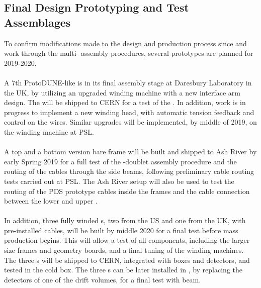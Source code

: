 


\subsection{Final Design Prototyping and Test Assemblages}
\label{sec:fdsp-apa-qa-prototyping}

To confirm modifications made to the  design and production process since  and work through the multi- assembly procedures, several prototypes are planned for 2019-2020.\\
\\
A 7th ProtoDUNE-like  is in its final assembly stage at Daresbury Laboratory in the UK, by utilizing an upgraded winding machine with a new interface arm design. The  will be shipped to CERN for a test of the . In addition, work is in progress to implement a new winding head, with automatic tension feedback and control on the wires. Similar upgrades will be implemented, by middle of 2019, on the winding machine at %
PSL.\\
\\
A top and a bottom version bare  frame will be built and shipped to Ash River by early Spring 2019 for a full test of the -doublet assembly procedure and the routing of the  cables through the  side beams, following preliminary cable routing tests carried out at %
PSL. The Ash River setup will also be used to test the routing of the PDS prototype cables inside the  frames and the cable connection between the lower and upper .\\
\\
In addition, three fully winded s, two from the US and one from the UK, with pre-installed  cables, will be built by middle 2020 for a final test before mass production begins. This will allow a test of all  components, including the larger size frames and geometry boards, and a final tuning of the winding machines. The three s will be shipped to CERN, integrated with  boxes and  detectors, and tested in the cold box. The three s can be later installed in , by replacing the detectors of one of the drift volumes, for a final test with beam.  

